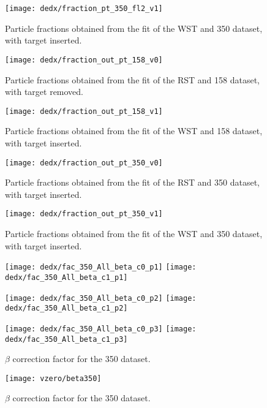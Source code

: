 \begin{figure}
  \centering
  \texttt{[image: dedx/fraction\_pt\_350\_fl2\_v1]}
  \caption{Particle fractions obtained from the \dedx fit of the WST and 350 \GeVc dataset, with target inserted.}
  \label{fig:hadron:dedx:fit:final350w}
\end{figure}

\begin{figure}
  \centering
  \texttt{[image: dedx/fraction\_out\_pt\_158\_v0]}
  \caption{Particle fractions obtained from the \dedx fit of the RST and 158 \GeVc dataset, with target removed.}
  \label{fig:hadron:dedx:fit:out158r}
\end{figure}

\begin{figure}
  \centering
  \texttt{[image: dedx/fraction\_out\_pt\_158\_v1]}
  \caption{Particle fractions obtained from the \dedx fit of the WST and 158 \GeVc dataset, with target inserted.}
  \label{fig:hadron:dedx:fit:out158w}
\end{figure}

\begin{figure}
  \centering
  \texttt{[image: dedx/fraction\_out\_pt\_350\_v0]}
  \caption{Particle fractions obtained from the \dedx fit of the RST and 350 \GeVc dataset, with target inserted.}
  \label{fig:hadron:dedx:fit:out350r}
\end{figure}

\begin{figure}
  \centering
  \texttt{[image: dedx/fraction\_out\_pt\_350\_v1]}
  \caption{Particle fractions obtained from the \dedx fit of the WST and 350 \GeVc dataset, with target inserted.}
  \label{fig:hadron:dedx:fit:out350w}
\end{figure}

\clearpage


\begin{figure}
  \centering
  \texttt{[image: dedx/fac\_350\_All\_beta\_c0\_p1]}
  \texttt{[image: dedx/fac\_350\_All\_beta\_c1\_p1]}

  \texttt{[image: dedx/fac\_350\_All\_beta\_c0\_p2]}
  \texttt{[image: dedx/fac\_350\_All\_beta\_c1\_p2]}

  \texttt{[image: dedx/fac\_350\_All\_beta\_c0\_p3]}
  \texttt{[image: dedx/fac\_350\_All\_beta\_c1\_p3]}

  \caption{$\beta$ correction factor for the 350 \GeVc dataset.}
  \label{fig:hadron:correction:beta:dedx350}
\end{figure}


\begin{figure}
  \centering
  \texttt{[image: vzero/beta350]}
  
  \caption{$\beta$ correction factor for the 350 \GeVc dataset.}
  \label{fig:hadron:correction:beta:vzero350}
\end{figure}

